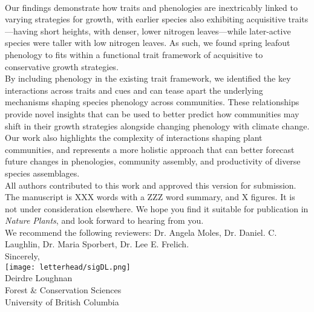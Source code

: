 \documentclass[11pt,a4paper]{article}
\begin{document}
\vspace{1.5ex}\\
\noindent  Our findings demonstrate how traits and phenologies are inextricably linked to varying strategies for growth, with earlier species also exhibiting acquisitive traits---having short heights, with denser, lower nitrogen leaves---while later-active species were taller with low nitrogen leaves. As such, we found spring leafout phenology to fits within a functional trait framework of acquisitive to conservative growth strategies.
\vspace{1.5ex}\\
\noindent By including phenology in the existing trait framework, we identified the key interactions across traits and cues and can tease apart the underlying mechanisms shaping species phenology across communities. These relationships provide novel insights that can be used to better predict how communities may shift in their growth strategies alongside changing phenology with climate change. Our work also highlights the complexity of interactions shaping plant communities, and represents a more holistic approach that can better forecast future changes in phenologies, community assembly, and productivity of diverse species assemblages.
\vspace{1.5ex}\\
\noindent All authors contributed to this work and approved this version for submission. The manuscript is XXX words with a ZZZ word summary, and X figures. It is not under consideration elsewhere. We hope you find it suitable for publication in \emph{Nature Plants}, and look forward to hearing from you. 
\vspace{1.5ex}\\
\noindent We recommend the following reviewers: Dr. Angela Moles,  Dr. Daniel. C. Laughlin, Dr. Maria Sporbert, Dr. Lee E. Frelich.
\vspace{1.5ex}\\
\noindent Sincerely, \\
\texttt{[image: letterhead/sigDL.png]} \\
\noindent Deirdre Loughnan\\
\noindent Forest \& Conservation Sciences\\
\noindent University of British Columbia

\newpage

\vspace{-5ex}
% 


\newpage
\end{document}
